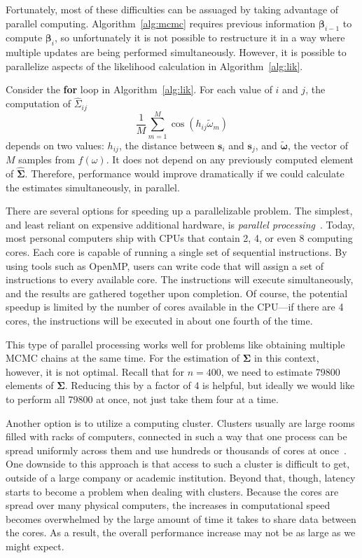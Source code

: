 Fortunately, most of these difficulties can be assuaged by taking advantage of parallel computing. Algorithm~\ref{alg:mcmc} requires previous information $\bm{\beta}_{i-1}$ to compute $\bm{\beta}_i$, so unfortunately it is not possible to restructure it in a way where multiple updates are being performed simultaneously. However, it is possible to parallelize aspects of the likelihood calculation in Algorithm~\ref{alg:lik}.

Consider the \textbf{for} loop in Algorithm~\ref{alg:lik}. For each value of $i$ and $j$, the computation of $\widehat{\Sigma}_{ij}$
\[
	\frac{1}{M} \sum_{m=1}^M \cos(h_{ij} \widetilde{\omega}_m)
\]
depends on two values: $h_{ij}$, the distance between $\bm{s}_i$ and $\bm{s}_j$, and $\widetilde{\bm{\omega}}$, the vector of $M$ samples from $f(\omega)$. It does not depend on any previously computed element of $\widehat{\bm{\Sigma}}$. Therefore, performance would improve dramatically if we could calculate the estimates simultaneously, in parallel.

There are several options for speeding up a parallelizable problem. The simplest, and least reliant on expensive additional hardware, is \emph{parallel processing}~\cite{suchard2010understanding}. Today, most personal computers ship with CPUs that contain 2, 4, or even 8 computing cores. Each core is capable of running a single set of sequential instructions. By using tools such as OpenMP, users can write code that will assign a set of instructions to every available core. The instructions will execute simultaneously, and the results are gathered together upon completion. Of course, the potential speedup is limited by the number of cores available in the CPU---if there are 4 cores, the instructions will be executed in about one fourth of the time.

This type of parallel processing works well for problems like obtaining multiple MCMC chains at the same time. For the estimation of $\bm{\Sigma}$ in this context, however, it is not optimal. Recall that for $n = 400$, we need to estimate $79800$ elements of $\bm{\Sigma}$. Reducing this by a factor of 4 is helpful, but ideally we would like to perform all $79800$ at once, not just take them four at a time.

Another option is to utilize a computing cluster. Clusters usually are large rooms filled with racks of computers, connected in such a way that one process can be spread uniformly across them and use hundreds or thousands of cores at once~\cite{suchard2010understanding}. One downside to this approach is that access to such a cluster is difficult to get, outside of a large company or academic institution. Beyond that, though, latency starts to become a problem when dealing with clusters. Because the cores are spread over many physical computers, the increases in computational speed becomes overwhelmed by the large amount of time it takes to share data between the cores. As a result, the overall performance increase may not be as large as we might expect.

